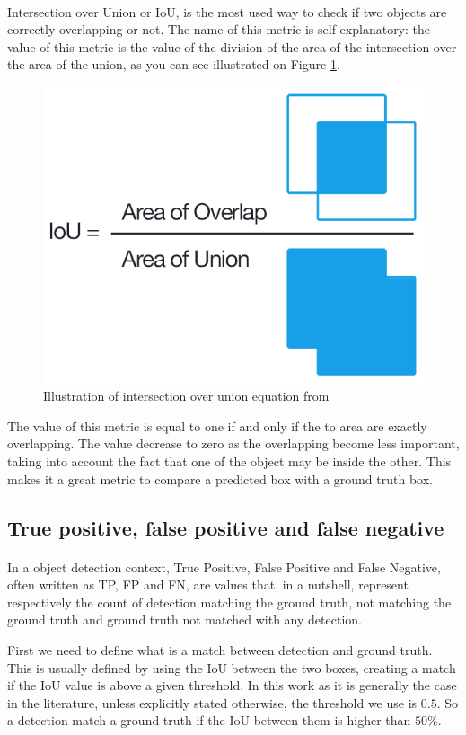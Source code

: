 \paragraph{}
Intersection over Union or IoU, is the most used way to check if two objects are correctly overlapping or not. The name of this metric is self explanatory: the value of this metric is the value of the division of the area of the intersection over the area of the union, as you can see illustrated on Figure \ref{fig:iou}.

\begin{figure}
    \centering
    \includegraphics[width=0.3\linewidth]{figures/Intersection_over_Union_-_visual_equation.png}
    \caption{Illustration of intersection over union equation from \cite{wiki:iou}}
    \label{fig:iou}
\end{figure}{}

The value of this metric is equal to one if and only if the to area are exactly overlapping. The value decrease to zero as the overlapping become less important, taking into account the fact that one of the object may be inside the other. This makes it a great metric to compare a predicted box with a ground truth box.

\subsection{True positive, false positive and false negative}
\paragraph{}
In a object detection context, True Positive, False Positive and False Negative, often written as TP, FP and FN, are values that, in a nutshell, represent respectively the count of detection matching the ground truth, not matching the ground truth and ground truth not matched with any detection. 

First we need to define what is a match between detection and ground truth. This is usually defined by using the IoU between the two boxes, creating a match if the IoU value is above a given threshold. In this work as it is generally the case in the literature, unless explicitly stated otherwise, the threshold we use is $0.5$. So a detection match a ground truth if the IoU between them is higher than $50\%$.

